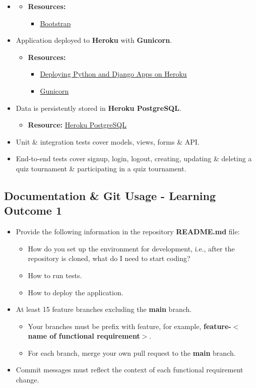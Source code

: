 \documentclass{article}
\begin{document}
\begin{itemize}
	\item 
	\begin{itemize}
		\item \textbf{Resources:}
		\begin{itemize}
			\item \href{https://getbootstrap.com}{Bootstrap}
		\end{itemize}
	\end{itemize}
	\item Application deployed to \textbf{Heroku} with \textbf{Gunicorn}.
	\begin{itemize}
		\item \textbf{Resources:} 
		\begin{itemize}
			\item \href{https://devcenter.heroku.com/articles/deploying-python}{Deploying Python and Django Apps on Heroku}
			\item \href{https://gunicorn.org/}{Gunicorn}
		\end{itemize}
	\end{itemize}
	\item Data is persistently stored in \textbf{Heroku PostgreSQL}.
	\begin{itemize}
		\item \textbf{Resource:} \href{https://www.heroku.com/postgres}{Heroku PostgreSQL}
	\end{itemize}
	\item Unit \& integration tests cover models, views, forms \& API.
	\item End-to-end tests cover signup, login, logout, creating, updating \& deleting a quiz tournament \& participating in a quiz tournament.
\end{itemize}

\subsection*{Documentation \& Git Usage - Learning Outcome 1}
\begin{itemize}
    \item Provide the following information in the repository \textbf{README.md} file:
    \begin{itemize}
		\item How do you set up the environment for development, i.e., after the repository is cloned, what do I need to start coding?
		\item How to run tests.
		\item How to deploy the application.
    \end{itemize}
    \item At least 15 feature branches excluding the \textbf{main} branch.
    \begin{itemize}
        \item Your branches must be prefix with feature, for example, \textbf{feature-$<$name of functional requirement$>$}.
        \item For each branch, merge your own pull request to the \textbf{main} branch.
    \end{itemize}
    \item Commit messages must reflect the context of each functional requirement change.
\end{itemize}
\end{document}
